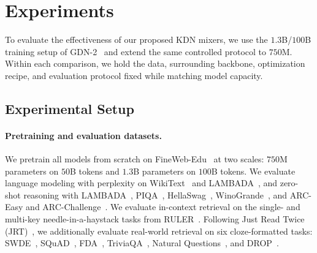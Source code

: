 \documentclass[11pt,letterpaper,logo]{yalearxiv}
\begin{document}
\section{Experiments}
\label{sec:experiments}

To evaluate the effectiveness of our proposed KDN mixers, we use the $1.3$B/$100$B training setup of
GDN-2~\citep{hatamizadeh2026gdn2} and extend the same controlled protocol to $750$M. Within
each comparison, we hold the data, surrounding backbone, optimization recipe, and evaluation
protocol fixed while matching model capacity.

\subsection{Experimental Setup}
\label{sec:experimental-setup}

\paragraph{Pretraining and evaluation datasets.}
We pretrain all models from scratch on FineWeb-Edu~\citep{penedo2024fineweb} at two scales:
$750$M parameters on $50$B tokens and $1.3$B parameters on $100$B tokens. We evaluate language
modeling with perplexity on WikiText~\citep{merity2017pointer} and
LAMBADA~\citep{paperno2016lambada}, and zero-shot reasoning with
LAMBADA~\citep{paperno2016lambada}, PIQA~\citep{bisk2020piqa},
HellaSwag~\citep{zellers2019hellaswag}, WinoGrande~\citep{sakaguchi2020winogrande}, and
ARC-Easy and ARC-Challenge~\citep{clark2018arc}. We evaluate
in-context retrieval on the single- and multi-key needle-in-a-haystack tasks from
RULER~\citep{hsieh2024ruler}. Following Just Read Twice (JRT)~\citep{arora2024justreadtwice},
we additionally evaluate real-world retrieval on six cloze-formatted tasks: SWDE~\citep{lockard2019openceres},
SQuAD~\citep{rajpurkar2018squad}, FDA~\citep{arora2023evaporate},
TriviaQA~\citep{joshi2017triviaqa}, Natural Questions~\citep{kwiatkowski2019natural}, and
DROP~\citep{dua2019drop}.
\end{document}
